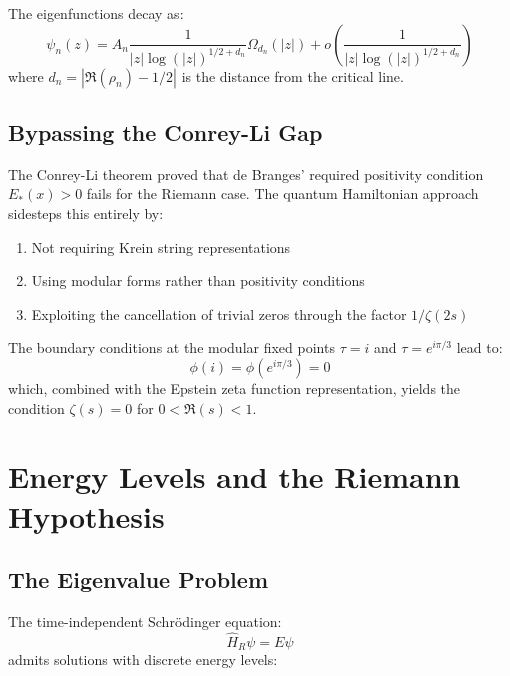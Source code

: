 \begin{insight}
The eigenfunctions decay as:
\begin{equation}
\psi_n(z) = A_n \frac{1}{|z|\log(|z|)^{1/2+d_n}} \Omega_{d_n}(|z|) + o\left(\frac{1}{|z|\log(|z|)^{1/2+d_n}}\right)
\end{equation}
where $d_n = |\Re(\rho_n) - 1/2|$ is the distance from the critical line.
\end{insight}

\subsection{Bypassing the Conrey-Li Gap}

The Conrey-Li theorem proved that de Branges' required positivity condition $E_*(x) > 0$ fails for the Riemann case. The quantum Hamiltonian approach sidesteps this entirely by:

\begin{enumerate}
\item Not requiring Krein string representations
\item Using modular forms rather than positivity conditions
\item Exploiting the cancellation of trivial zeros through the factor $1/\zeta(2s)$
\end{enumerate}

\begin{result}
The boundary conditions at the modular fixed points $\tau = i$ and $\tau = e^{i\pi/3}$ lead to:
\begin{equation}
\phi(i) = \phi(e^{i\pi/3}) = 0
\end{equation}
which, combined with the Epstein zeta function representation, yields the condition $\zeta(s) = 0$ for $0 < \Re(s) < 1$.
\end{result}

\section{Energy Levels and the Riemann Hypothesis}

\subsection{The Eigenvalue Problem}

The time-independent Schrödinger equation:
\begin{equation}
\hat{H}_R \psi = E\psi
\end{equation}
admits solutions with discrete energy levels:

